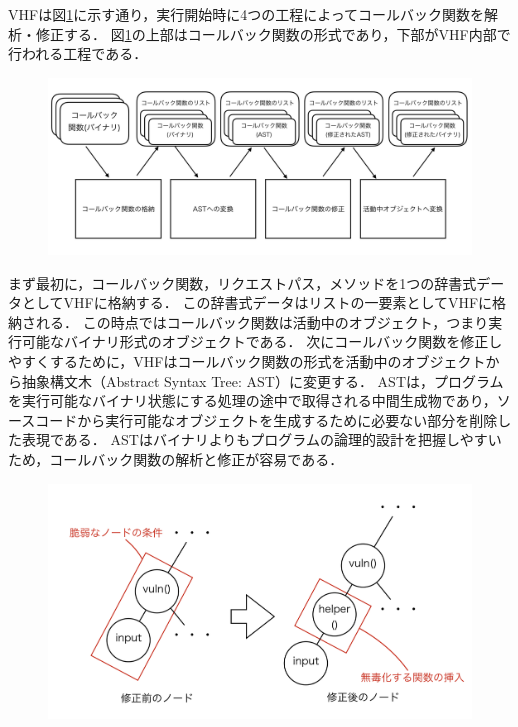 \documentclass[a4paper,12pt]{jreport}
\begin{document}
VHFは図\ref{fig:4steps}に示す通り，実行開始時に4つの工程によってコールバック関数を解析・修正する．
図\ref{fig:4steps}の上部はコールバック関数の形式であり，下部がVHF内部で行われる工程である．
\begin{figure}[ht]
 \begin{center}
  \includegraphics[clip, width=130mm]{./figures/4steps.png}
  \label{fig:4steps}
 \end{center}
\end{figure}
まず最初に，コールバック関数，リクエストパス，メソッドを1つの辞書式データとしてVHFに格納する．
この辞書式データはリストの一要素としてVHFに格納される．
この時点ではコールバック関数は活動中のオブジェクト，つまり実行可能なバイナリ形式のオブジェクトである．
次にコールバック関数を修正しやすくするために，VHFはコールバック関数の形式を活動中のオブジェクトから抽象構文木\cite{ast}（Abstract Syntax Tree: AST）に変更する．
ASTは，プログラムを実行可能なバイナリ状態にする処理の途中で取得される中間生成物であり，ソースコードから実行可能なオブジェクトを生成するために必要ない部分を削除した表現である．
ASTはバイナリよりもプログラムの論理的設計を把握しやすいため，コールバック関数の解析と修正が容易である．
\begin{figure}[t]
 \begin{center}
  \includegraphics[clip, width=130mm]{./figures/modifying_ast.png}
  \label{fig:modifying_ast}
 \end{center}
\end{figure}
\end{document}
